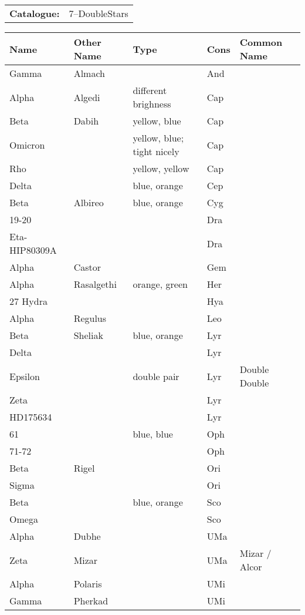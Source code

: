 \begin{tabular}{ p{0.9in} p{1.3in}}
{\bf Catalogue:} & 7--DoubleStars \\ 
\end{tabular}
\begin{longtable}{ p{0.7in}  p{1.0in}  p{0.6in}  p{0.9in}  p{5.1in} }
\hline 
{\bf Name} & {\bf Other Name} & {\bf Type} & {\bf Cons} & {\bf Common Name} \\ 
\hline 
Gamma & Almach &  & And &  \\ 
Alpha & Algedi & different brighness & Cap &  \\ 
Beta & Dabih & yellow, blue & Cap &  \\ 
Omicron &  & yellow, blue; tight nicely & Cap &  \\ 
Rho &  & yellow, yellow & Cap &  \\ 
Delta &  & blue, orange & Cep &  \\ 
Beta & Albireo & blue, orange & Cyg &  \\ 
19-20 &  &  & Dra &  \\ 
Eta-HIP80309A &  &  & Dra &  \\ 
Alpha & Castor &  & Gem &  \\ 
Alpha & Rasalgethi & orange, green & Her &  \\ 
27 Hydra &  &  & Hya &  \\ 
Alpha & Regulus &  & Leo &  \\ 
Beta & Sheliak & blue, orange & Lyr &  \\ 
Delta &  &  & Lyr &  \\ 
Epsilon &  & double pair & Lyr & Double Double \\ 
Zeta &  &  & Lyr &  \\ 
HD175634 &  &  & Lyr &  \\ 
61 &  & blue, blue & Oph &  \\ 
71-72 &  &  & Oph &  \\ 
Beta & Rigel &  & Ori &  \\ 
Sigma &  &  & Ori &  \\ 
Beta &  & blue, orange & Sco &  \\ 
Omega &  &  & Sco &  \\ 
Alpha & Dubhe &  & UMa &  \\ 
Zeta & Mizar &  & UMa & Mizar / Alcor \\ 
Alpha & Polaris &  & UMi &  \\ 
Gamma & Pherkad &  & UMi &  \\ 
\hline 
\end{longtable} 
